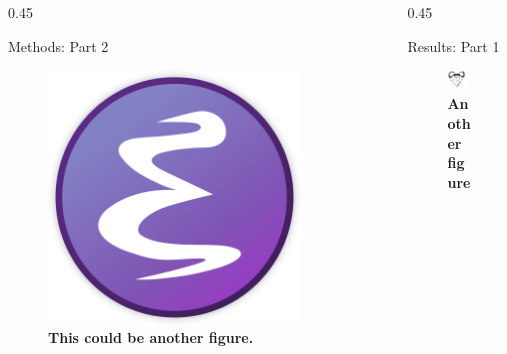 \documentclass[final]{beamer}
\begin{document}
\begin{frame}[label={sec:org8f3d3e7}]{}
\begin{columns}
\begin{column}[t]{0.45\textwidth\columnwidth}
\begin{block}{Methods: Part 2}
\captionsetup{justification=justified,width=.85\linewidth}
\begin{figure}[htbp]
\centering
\includegraphics[width=0.85\textwidth]{org-mode-poster-2.png}
\caption{\label{fig:org95c7011}
\textbf{This could be another figure.}}
\end{figure}
\end{block}
\end{column}

\begin{column}[t]{0.45\textwidth\columnwidth}
\begin{block}{Results: Part 1}
\captionsetup{justification=justified,width=.8\linewidth}
\begin{figure}[htbp]
\centering
\includegraphics[width=0.8\textwidth]{org-mode-poster-3.png}
\caption{\label{fig:org89b785d}
\textbf{Another figure}}
\end{figure}
\end{block}


\end{column}
\end{columns}
\end{frame}
\end{document}
